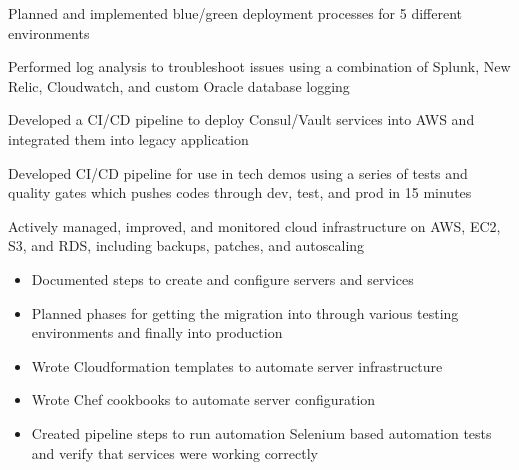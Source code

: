 \begin{cventries}
{\begin{cvitems}
        \item {Planned and implemented blue/green deployment processes for 5 different environments}
        \item {Performed log analysis to troubleshoot issues using a combination of Splunk, New Relic, Cloudwatch, and custom Oracle database logging}
        \item {Developed a CI/CD pipeline to deploy Consul/Vault services into AWS and integrated them into legacy application}
        \item {Developed CI/CD pipeline for use in tech demos using a series of tests and quality gates which pushes codes through dev, test, and prod in 15 minutes}
        \item {Actively managed, improved, and monitored cloud infrastructure on AWS, EC2, S3, and RDS, including backups, patches, and autoscaling}
        \begin{itemize}
          \item {Documented steps to create and configure servers and services}
          \item {Planned phases for getting the migration into through various testing environments and finally into production}
          \item {Wrote Cloudformation templates to automate server infrastructure}
          \item {Wrote Chef cookbooks to automate server configuration}
          \item {Created pipeline steps to run automation Selenium based automation tests and verify that services were working correctly}

\end{itemize}
\end{cvitems}}
\end{cventries}
